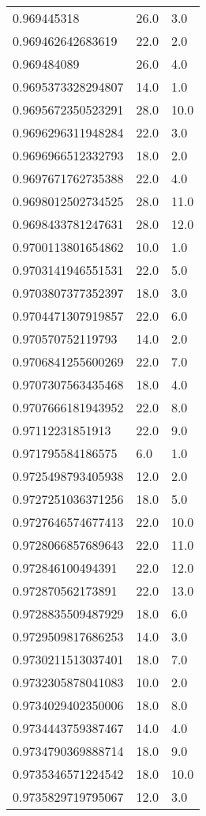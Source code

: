 \begin{center}
\begin{supertabular}[H]{p{0.30\textwidth}p{0.05\textwidth}p{0.05\textwidth}}
0.969445318 & 26.0 & 3.0 \\ 
0.969462642683619 & 22.0 & 2.0 \\ 
0.969484089 & 26.0 & 4.0 \\ 
0.9695373328294807 & 14.0 & 1.0 \\ 
0.9695672350523291 & 28.0 & 10.0 \\ 
0.9696296311948284 & 22.0 & 3.0 \\ 
0.9696966512332793 & 18.0 & 2.0 \\ 
0.9697671762735388 & 22.0 & 4.0 \\ 
0.9698012502734525 & 28.0 & 11.0 \\ 
0.9698433781247631 & 28.0 & 12.0 \\ 
0.9700113801654862 & 10.0 & 1.0 \\ 
0.9703141946551531 & 22.0 & 5.0 \\ 
0.9703807377352397 & 18.0 & 3.0 \\ 
0.9704471307919857 & 22.0 & 6.0 \\ 
0.970570752119793 & 14.0 & 2.0 \\ 
0.9706841255600269 & 22.0 & 7.0 \\ 
0.9707307563435468 & 18.0 & 4.0 \\ 
0.9707666181943952 & 22.0 & 8.0 \\ 
0.97112231851913 & 22.0 & 9.0 \\ 
0.971795584186575 & 6.0 & 1.0 \\ 
0.9725498793405938 & 12.0 & 2.0 \\ 
0.9727251036371256 & 18.0 & 5.0 \\ 
0.9727646574677413 & 22.0 & 10.0 \\ 
0.9728066857689643 & 22.0 & 11.0 \\ 
0.972846100494391 & 22.0 & 12.0 \\ 
0.972870562173891 & 22.0 & 13.0 \\ 
0.9728835509487929 & 18.0 & 6.0 \\ 
0.9729509817686253 & 14.0 & 3.0 \\ 
0.9730211513037401 & 18.0 & 7.0 \\ 
0.9732305878041083 & 10.0 & 2.0 \\ 
0.9734029402350006 & 18.0 & 8.0 \\ 
0.9734443759387467 & 14.0 & 4.0 \\ 
0.9734790369888714 & 18.0 & 9.0 \\ 
0.9735346571224542 & 18.0 & 10.0 \\ 
0.9735829719795067 & 12.0 & 3.0 \\ 

\end{supertabular}
\end{center}
